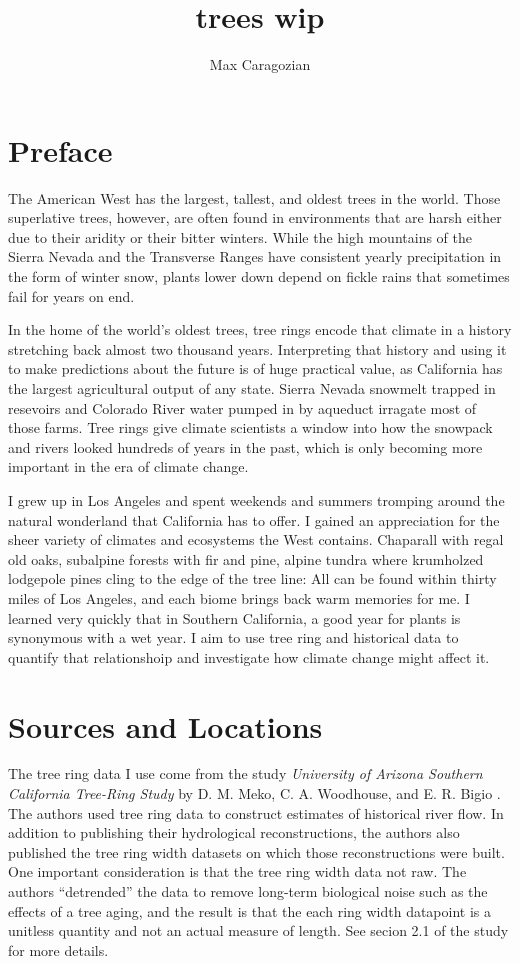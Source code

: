 \documentclass[]{article}
\title{trees wip}
\author{Max Caragozian}
\begin{document}
	


\maketitle

\section{Preface}
The  American West has the largest, tallest, and oldest trees in the world. Those superlative trees, however, are often found in environments that are harsh either due to their aridity or their bitter winters. While the high mountains of the Sierra Nevada and the Transverse Ranges have consistent yearly precipitation in the form of winter snow, plants lower down depend on fickle rains that sometimes fail for years on end.

In the home of the world's oldest trees, tree rings encode that climate in a history stretching back almost two thousand years. Interpreting that history and using it to make predictions about the future is of huge practical value, as California has the largest agricultural output of any state. Sierra Nevada snowmelt trapped in resevoirs and Colorado River water pumped in by aqueduct irragate most of those farms. Tree rings give climate scientists a window into how the snowpack and rivers looked hundreds of years in the past, which is only becoming more important in the era of climate change.

I grew up in Los Angeles and spent weekends and summers tromping around the natural wonderland that California has to offer. I gained an appreciation for the sheer variety of climates and ecosystems the West contains. Chaparall with regal old oaks, subalpine forests with fir and pine, alpine tundra where krumholzed lodgepole pines cling to the edge of the tree line: All can be found within thirty miles of Los Angeles, and each biome brings back warm memories for me. I learned very quickly that in Southern California, a good year for plants is synonymous with a wet year. I aim to use tree ring and historical data to quantify that relationshoip and investigate how climate change might affect it. 

\section{Sources and Locations}
The tree ring data I use come from the study \textit{University of Arizona Southern California Tree-Ring Study} by D. M. Meko, C. A. Woodhouse, and E. R. Bigio \cite{tree_study}. The authors used tree ring data to construct estimates of historical river flow. In addition to publishing their hydrological reconstructions, the authors also published the tree ring width datasets on which those reconstructions were built. One important consideration is that the tree ring width data not raw. The authors ``detrended'' the data to remove long-term biological noise such as the effects of a tree aging, and the result is that the each ring width datapoint is a unitless quantity and not an actual measure of length. See secion 2.1 of the study for more details\cite{tree_study}.
\end{document}
